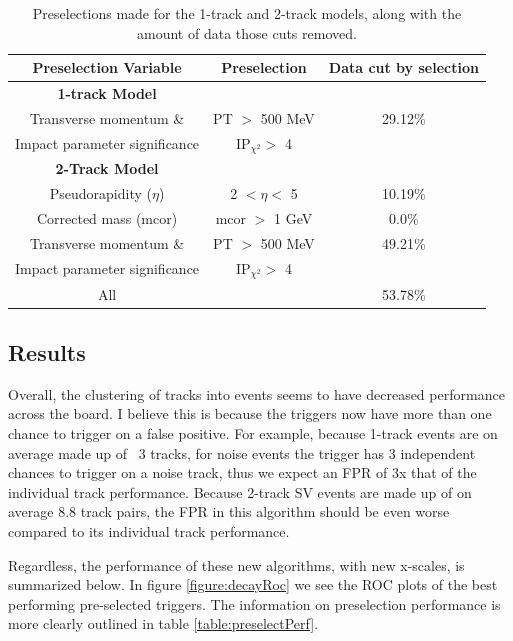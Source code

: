 \documentclass[12pt, letterpaper]{article}
\begin{document}
\begin{center}
\begin{table}
\begin{tabular}{ c|c|c } 

 Preselection Variable & Preselection & Data cut by selection \\ 
 \hline
 \textbf{1-track Model} &  &  \\ 
 Transverse momentum \& & PT $>$ 500 MeV & 29.12\% \\
 Impact parameter significance & $\mathrm{IP}_{\chi^2} >$ 4 & \\ 
 \hline
 \textbf{2-Track Model} & & \\
 Pseudorapidity ($\eta$) & 2 $< \eta <$ 5 & 10.19\%\\
 Corrected mass (mcor) & mcor $>$ 1 GeV & 0.0\%\\
  Transverse momentum \& & PT $>$ 500 MeV & 49.21\% \\
 Impact parameter significance & $\mathrm{IP}_{\chi^2} >$ 4 & \\ 
 All & & 53.78\% \\
 
 
\end{tabular}
\caption{Preselections made for the 1-track and 2-track models, along with the amount of data those cuts removed.}
\label{table:preselect}
\end{table}
\end{center}


\subsection{Results}
Overall, the clustering of tracks into events seems to have decreased performance across the board. I believe this is because the triggers now have more than one chance to trigger on a false positive. For example, because 1-track events are on average made up of ~3 tracks, for noise events the trigger has 3 independent chances to trigger on a noise track, thus we expect an FPR of 3x that of the individual track performance. Because 2-track SV events are made up of on average 8.8 track pairs, the FPR in this algorithm should be even worse compared to its individual track performance.

Regardless, the performance of these new algorithms, with new x-scales, is summarized below. In figure \ref{figure:decayRoc} we see the ROC plots of the best performing pre-selected triggers. The information on preselection performance is more clearly outlined in table \ref{table:preselectPerf}.
\end{document}
